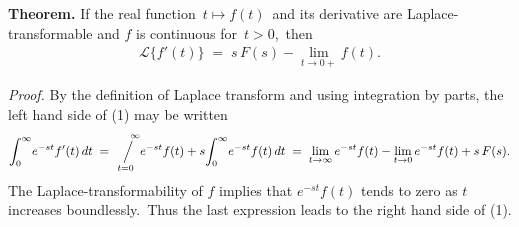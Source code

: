 \documentclass[12pt]{article}
\newcommand{\sijoitus}[2]%
{\operatornamewithlimits{\Big/}_{\!\!\!#1}^{\,#2}}
\begin{document}
\textbf{Theorem.}\; If the real function \,$t \mapsto f(t)$\, and its derivative are Laplace-transformable and $f$ is continuous for\, $t > 0$,\, then
\begin{align}
\mathcal{L}\{f'(t)\} \;=\; s\,F(s)-\lim_{t\to0+}\!f(t).
\end{align}

{\em Proof.}\; By the definition of Laplace transform and using integration by parts, the left hand side of (1) may be written
$$\int_0^\infty\!e^{-st}f'(t)\,dt 
\;=\;  \sijoitus{t=0}{\quad \infty}\!e^{-st}f(t)+s\!\int_0^\infty\!e^{-st}f(t)\,dt
\;=\; \lim_{t\to\infty}e^{-st}f(t)-\lim_{t\to0}e^{-st}f(t)+s\,F(s).$$
The Laplace-transformability of $f$ implies that $e^{-st}f(t)$ tends to zero as $t$ increases boundlessly.\, Thus the last expression leads to the right hand side of (1).
\end{document}
